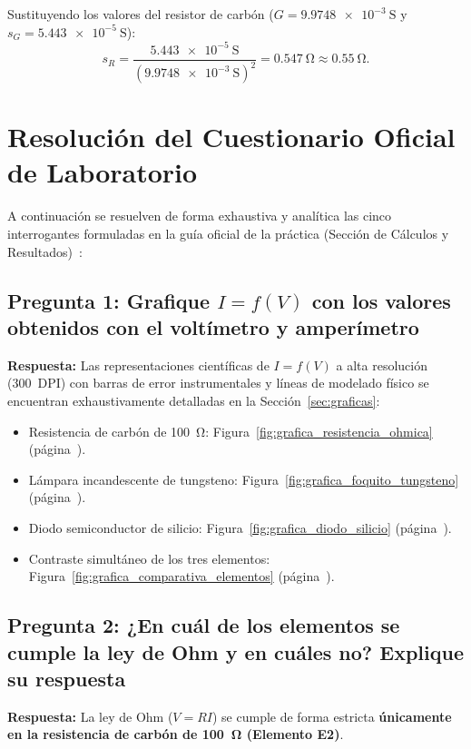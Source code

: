 \begin{appendices}
Sustituyendo los valores del resistor de carbón ($G = \qty{9,9748e-3}{\siemens}$ y $s_G = \qty{5,443e-5}{\siemens}$):
\begin{equation}
    s_R = \frac{\qty{5,443e-5}{\siemens}}{(\qty{9,9748e-3}{\siemens})^2} = \qty{0,547}{\ohm} \approx \qty{0,55}{\ohm}.
\end{equation}

\section{Resolución del Cuestionario Oficial de Laboratorio}
\label{anexo:cuestionario}

A continuación se resuelven de forma exhaustiva y analítica las cinco interrogantes formuladas en la guía oficial de la práctica (Sección de Cálculos y Resultados)~\cite{guia_lab_uni}:

\subsection{Pregunta 1: Grafique \texorpdfstring{$I = f(V)$}{I = f(V)} con los valores obtenidos con el voltímetro y amperímetro}
\textbf{Respuesta:}  
Las representaciones científicas de $I = f(V)$ a alta resolución (\qty{300}{DPI}) con barras de error instrumentales y líneas de modelado físico se encuentran exhaustivamente detalladas en la Sección~\ref{sec:graficas}:
\begin{itemize}
    \item Resistencia de carbón de \qty{100}{\ohm}: Figura~\ref{fig:grafica_resistencia_ohmica} (página~\pageref{fig:grafica_resistencia_ohmica}).
    \item Lámpara incandescente de tungsteno: Figura~\ref{fig:grafica_foquito_tungsteno} (página~\pageref{fig:grafica_foquito_tungsteno}).
    \item Diodo semiconductor de silicio: Figura~\ref{fig:grafica_diodo_silicio} (página~\pageref{fig:grafica_diodo_silicio}).
    \item Contraste simultáneo de los tres elementos: Figura~\ref{fig:grafica_comparativa_elementos} (página~\pageref{fig:grafica_comparativa_elementos}).
\end{itemize}

\subsection{Pregunta 2: ¿En cuál de los elementos se cumple la ley de Ohm y en cuáles no? Explique su respuesta}
\textbf{Respuesta:}  
La ley de Ohm ($V = R I$) se cumple de forma estricta \textbf{únicamente en la resistencia de carbón de \qty{100}{\ohm} (Elemento E2)}. 


\end{appendices}
